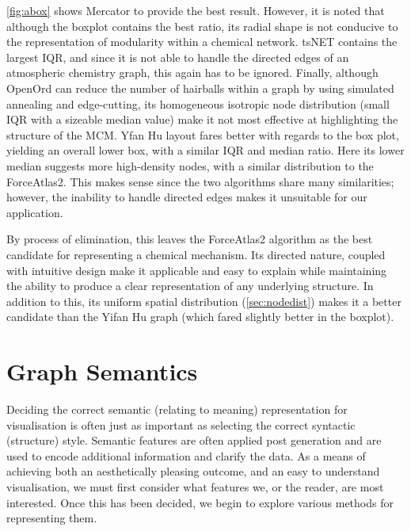 \autoref{fig:abox} shows Mercator to provide the best result. However, it is noted that although the boxplot contains the best ratio, its radial shape is not conducive to the representation of modularity within a chemical network. tsNET contains the largest IQR, and since it is not able to handle the directed edges of an atmospheric chemistry graph, this again has to be ignored. Finally, although OpenOrd can reduce the number of hairballs within a graph by using simulated annealing and edge-cutting, its homogeneous isotropic node distribution (small IQR with a sizeable median value) make it not most effective at highlighting the structure of the MCM.  Yfan Hu layout fares better with regards to the box plot, yielding an overall lower box, with a similar IQR and median ratio. Here its lower median suggests more high-density nodes, with a similar distribution to the ForceAtlas2. This makes sense since the two algorithms share many similarities; however, the inability to handle directed edges makes it unsuitable for our application.

By process of elimination, this leaves the ForceAtlas2 algorithm as the best candidate for representing a chemical mechanism. Its directed nature, coupled with intuitive design make it applicable and easy to explain while maintaining the ability to produce a clear representation of any underlying structure. In addition to this, its uniform spatial distribution (\autoref{sec:nodedist}) makes it a better candidate than the Yifan Hu graph (which fared slightly better in the boxplot).









\section{Graph Semantics}\label{semantic}

Deciding the correct semantic (relating to meaning) representation for visualisation is often just as important as selecting the correct syntactic (structure) style. Semantic features are often applied post generation \citep{aestheticsgraphvis} and are used to encode additional information and clarify the data. As a means of achieving both an aesthetically pleasing outcome, and an easy to understand visualisation, we must first consider what features we, or the reader, are most interested. Once this has been decided, we begin to explore various methods for representing them.

